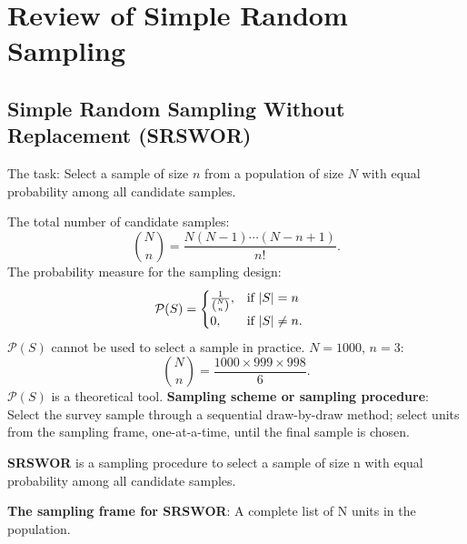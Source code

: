 \documentclass[oneside]{book}\usepackage[]{graphicx}\usepackage[svgnames]{xcolor}
\DeclarePairedDelimiter\abs{\lvert}{\rvert}
\begin{document}
\chapter{Review of Simple Random Sampling}
\section{Simple Random Sampling Without Replacement (SRSWOR)}
The task: Select a sample of size $n$ from a population of size $N$ with
equal probability among all candidate samples.

The total number of candidate samples:
\[ \binom{N}{n}=\frac{N(N-1)\cdots(N-n+1)}{n!}. \]
The probability measure for the sampling design:
\begin{align*}
      \mathcal{P}(S)
       & =\begin{cases}
                \frac{1}{\binom{N}{n}}, & \text{if $\abs{S}=n$}     \\
                0,                      & \text{if $\abs{S}\ne n$}.
          \end{cases}
\end{align*}
$ \mathcal{P}(S) $ cannot be used to select a sample in practice.
$ N=1000 $, $ n=3 $:
\[ \binom{N}{n}=\frac{1000\times 999\times 998}{6}. \]
$ \mathcal{P}(S) $ is a theoretical tool.
\textbf{Sampling scheme or sampling procedure}:
Select the survey sample through a sequential draw-by-draw method;
select units from the sampling frame, one-at-a-time, until the final
sample is chosen.

\textbf{SRSWOR} is a sampling procedure to select a sample of size n with
equal probability among all candidate samples.

\textbf{The sampling frame for SRSWOR}:
A complete list of N units in the population.
\end{document}
